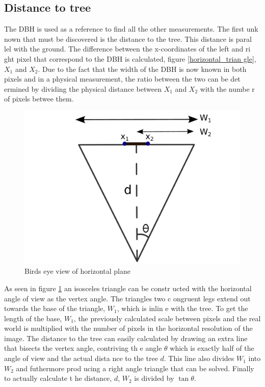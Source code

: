 \subsection{Distance to tree}
The DBH is used as a reference to find all the other measurements. The first unk
nown that must be discovered is the distance to the tree. This distance is paral
lel with the ground. The difference between the x-coordinates of the left and ri
ght pixel that correspond to the DBH is calculated, figure \ref{horizontal_trian
gle}, $X_1$ and $X_2$. Due to the fact that the width of the DBH is now known in
 both pixels and in a physical measurement, the ratio between the two can be det
ermined by dividing the physical distance between $X_1$ and $X_2$ with the numbe
r of pixels betwee them.
\begin{figure}[htp]
\centering
{
	\includegraphics[scale=0.3]{horizontal_triangle.pdf}
	\caption{Birds eye view of horizontal plane}
	\label{horizontal_triangle}
}
\end{figure}
 As seen in figure \ref{horizontal_triangle} an isosceles triangle can be constr
ucted with the horizontal angle of view as the vertex angle. The triangles two c
ongruent legs extend out towards the base of the triangle, $W_1$, which is inlin
e with the tree. To get the length of the base, $W_1$, the previously calculated
 scale between pixels and the real world is multiplied with the number of pixels
 in the horizontal resolution of the image. The distance to the tree can easily 
calculated by drawing an extra line that bisects the vertex angle, contriving th
e angle $\theta$ which is exactly half of the angle of view and the actual dista
nce to the tree $d$. This line also divides $W_1$ into $W_2$ and futhermore prod
ucing a right angle triangle that can be solved. Finally to actually calculate t
he distance, $d$, $W_2$ is divided by $\tan{\theta}$.


